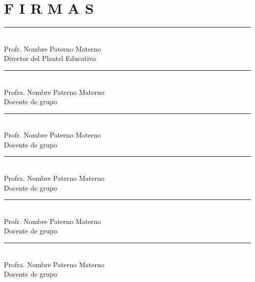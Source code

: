 \section*{F I R M A S}
\begin{multicols}{2}
    \begin{center}
        \rule{7cm}{0.4pt} \\[0.2cm]
        Profr. Nombre Paterno Materno \\ 
        Director del Plantel Educativo
    \end{center}

    \begin{center}
        \rule{7cm}{0.4pt} \\[0.2cm]
        Profra. Nombre Paterno Materno \\ 
        Docente de grupo
    \end{center}

    \begin{center}
        \rule{7cm}{0.4pt} \\[0.2cm]
        Profr. Nombre Paterno Materno \\ 
        Docente de grupo
    \end{center}

    \begin{center}
        \rule{7cm}{0.4pt} \\[0.2cm]
        Profra. Nombre Paterno Materno \\ 
        Docente de grupo
    \end{center}

    \begin{center}
        \rule{7cm}{0.4pt} \\[0.2cm]
        Profr. Nombre Paterno Materno \\ 
        Docente de grupo
    \end{center}

    \begin{center}
        \rule{7cm}{0.4pt} \\[0.2cm]
        Profra. Nombre Paterno Materno \\ 
        Docente de grupo
    \end{center}

    
\end{multicols}